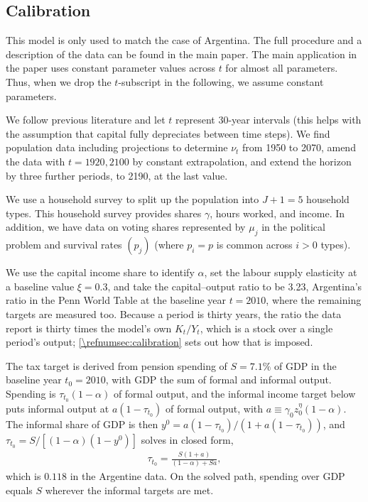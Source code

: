 \subsection{Calibration}\label{\refsec:calibration}
This model is only used to match the case of Argentina. The full procedure and a description of the data can be found in the main paper. The main application in the paper uses constant parameter values across $t$ for almost all parameters. Thus, when we drop the $t$-subscript in the following, we assume constant parameters.

We follow previous literature and let $t$ represent 30-year intervals (this helps with the assumption that capital fully depreciates between time steps). We find population data including projections to determine $\nu_t$ from 1950 to 2070, amend the data with $t = 1920, 2100$ by constant extrapolation, and extend the horizon by three further periods, to 2190, at the last value.

We use a household survey to split up the population into $J+1 = 5$ household types. This household survey provides shares $\gamma$, hours worked, and income. In addition, we have data on voting shares represented by $\mu_j$ in the political problem and survival rates $(p_j)$ (where $p_i = p$ is common across $i>0$ types).

We use the capital income share to identify $\alpha$, set the labour supply elasticity at a baseline value $\xi = 0.3$, and take the capital--output ratio to be 3.23, Argentina's ratio in the Penn World Table at the baseline year $t=2010$, where the remaining targets are measured too. Because a period is thirty years, the ratio the data report is thirty times the model's own $K_t/Y_t$, which is a stock over a single period's output; \cref{\refnumsec:calibration} sets out how that is imposed.

The tax target is derived from pension spending of $S = 7.1\%$ of GDP in the baseline year $t_0 = 2010$, with GDP the sum of formal and informal output. Spending is $\tau_{t_0}(1-\alpha)$ of formal output, and the informal income target below puts informal output at $a(1-\tau_{t_0})$ of formal output, with $a\equiv\gamma_0z_0^{\eta}(1-\alpha)$. The informal share of GDP is then $y^0 = a(1-\tau_{t_0})/(1+a(1-\tau_{t_0}))$, and $\tau_{t_0} = S/[(1-\alpha)(1-y^0)]$ solves in closed form,
\begin{align*}
    \tau_{t_0} = \frac{S(1+a)}{(1-\alpha)+Sa},
\end{align*}
which is $0.118$ in the Argentine data. On the solved path, spending over GDP equals $S$ wherever the informal targets are met.

